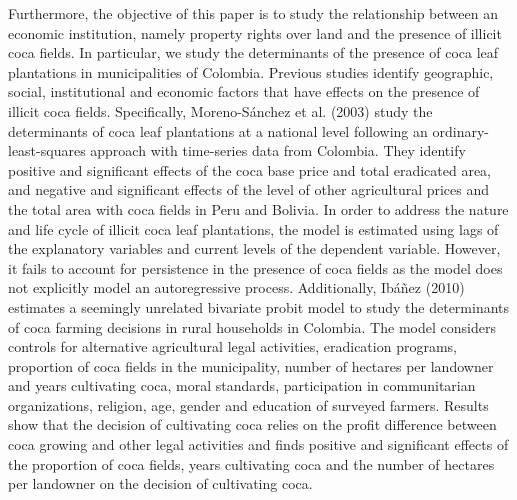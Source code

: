 Furthermore, the objective of this paper is to study the relationship between an economic institution, namely property rights over land and the presence of illicit coca fields. In particular, we study the determinants of the presence of coca leaf plantations in municipalities of Colombia. Previous studies identify geographic, social, institutional and economic factors that have effects on the presence of illicit coca fields. Specifically, Moreno-S\'{a}nchez et al. (2003) study the determinants of coca leaf plantations at a national level following an ordinary-least-squares approach with time-series data from Colombia. They identify positive and significant effects of the coca base price and total eradicated area, and negative and significant effects of the level of other agricultural prices and the total area with coca fields in Peru and Bolivia. In order to address the nature and life cycle of illicit coca leaf plantations, the model is estimated using lags of the explanatory variables and current levels of the dependent variable. However, it fails to account for persistence in the presence of coca fields as the model does not explicitly model an autoregressive process. Additionally, Ib\'{a}\~{n}ez (2010) estimates a seemingly unrelated bivariate probit model to study the determinants of coca farming decisions in rural households in Colombia. The model considers controls for alternative agricultural legal activities, eradication programs, proportion of coca fields in the municipality, number of hectares per landowner and years cultivating coca, moral standards, participation in communitarian organizations, religion, age, gender and education of surveyed farmers. Results show that the decision of cultivating coca relies on the profit difference between coca growing and other legal activities and finds positive and significant effects of the proportion of coca fields, years cultivating coca and the number of hectares per landowner on the decision of cultivating coca.

